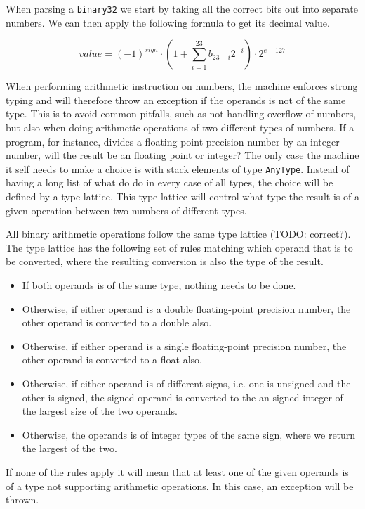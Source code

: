 When parsing a {\tt binary32} we start by taking all the correct bits out into
separate numbers. We can then apply the following formula to get its decimal
value.

\begin{equation}
  value = (-1)^{sign} \cdot (1 + \sum^{23}_{i=1} b_{23-i}2^{-i}) \cdot 2^{e - 127}
\end{equation}


When performing arithmetic instruction on numbers, the machine enforces strong
typing and will therefore throw an exception if the operands is not of the same
type. This is to avoid common pitfalls, such as not handling overflow of
numbers, but also when doing arithmetic operations of two different types of
numbers. If a program, for instance, divides a floating point precision number
by an integer number, will the result be an floating point or integer? The only
case the machine it self needs to make a choice is with stack elements of type
{\tt AnyType}. Instead of having a long list of what do do in every case of all
types, the choice will be defined by a type lattice. This type lattice will
control what type the result is of a given operation between two numbers of
different types.

All binary arithmetic operations follow the same type lattice (TODO:
correct?). The type lattice has the following set of rules matching which
operand that is to be converted, where the resulting conversion is also the type
of the result.
\begin{itemize}
  \item If both operands is of the same type, nothing needs to be done.
  \item Otherwise, if either operand is a double floating-point precision
    number, the other operand is converted to a double also.
  \item Otherwise, if either operand is a single floating-point precision
    number, the other operand is converted to a float also.
  \item Otherwise, if either operand is of different signs, i.e. one is unsigned
    and the other is signed, the signed operand is converted to the an signed
    integer of the largest size of the two operands.
  \item Otherwise, the operands is of integer types of the same sign, where we
    return the largest of the two.
\end{itemize}

If none of the rules apply it will mean that at least one of the given operands
is of a type not supporting arithmetic operations. In this case, an exception
will be thrown.

